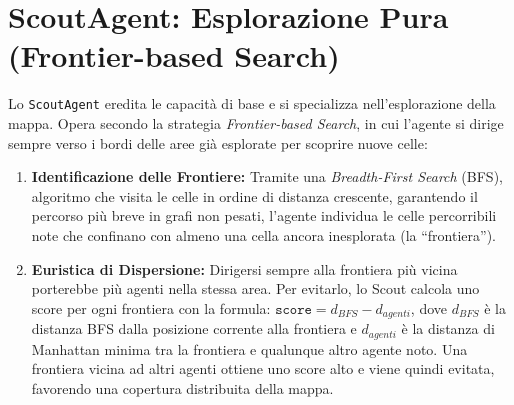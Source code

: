\documentclass[12pt,a4paper]{report}
\begin{document}
\section{ScoutAgent: Esplorazione Pura (Frontier-based Search)}
Lo \texttt{ScoutAgent} eredita le capacità di base e si specializza nell'esplorazione della mappa. Opera secondo la strategia \textit{Frontier-based Search}, in cui l'agente si dirige sempre verso i bordi delle aree già esplorate per scoprire nuove celle:
\begin{enumerate}
    \item \textbf{Identificazione delle Frontiere:} Tramite una \textit{Breadth-First Search} (BFS), algoritmo che visita le celle in ordine di distanza crescente, garantendo il percorso più breve in grafi non pesati, l'agente individua le celle percorribili note che confinano con almeno una cella ancora inesplorata (la ``frontiera'').
    \item \textbf{Euristica di Dispersione:} Dirigersi sempre alla frontiera più vicina porterebbe più agenti nella stessa area. Per evitarlo, lo Scout calcola uno score per ogni frontiera con la formula: $\texttt{score} = d_{BFS} - d_{agenti}$, dove $d_{BFS}$ è la distanza BFS dalla posizione corrente alla frontiera e $d_{agenti}$ è la distanza di Manhattan minima tra la frontiera e qualunque altro agente noto. Una frontiera vicina ad altri agenti ottiene uno score alto e viene quindi evitata, favorendo una copertura distribuita della mappa.
\end{enumerate}
\end{document}
